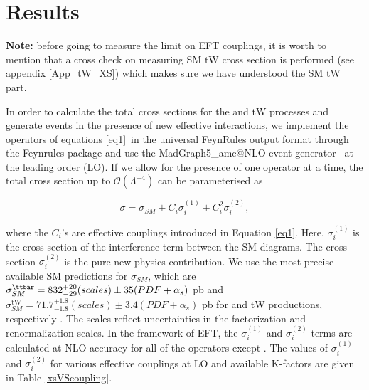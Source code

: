 \clearpage
\section{Results}
\label{tW_Results}

\textbf{Note:} before going to measure the limit on EFT couplings, it is worth to mention that a cross check on measuring SM tW cross section is performed (see appendix \ref{App_tW_XS}) which makes sure we have understood the SM tW part.

\medskip

In order to calculate the total cross sections for the \ttbar and tW processes and generate events in the presence of new effective interactions, we implement the operators of equations \ref{eq1}~in the universal FeynRules output format \cite{Degrande:2011ua} through the
Feynrules package \cite{Alloul:2013bka} and use the {\sc MadGraph5\_}a{\sc mc@NLO} event generator~\cite{MADGRAPH,Alwall:2014hca} at the leading order (LO).
If we allow for the presence of one operator at a time, the total cross section up to $\mathcal{O}(\Lambda^{-4})$ can be parameterised as

\begin{equation}
\label{eq:Limit}
        \sigma=\sigma_{SM}+C_i\sigma_i^{(1)}+C_i^2\sigma_{i}^{(2)},
\end{equation}

where the $C_i$'s are effective couplings introduced in Equation \ref{eq1}. Here, $\sigma_i^{(1)}$ is the cross section of the interference term between the SM diagrams. The cross section $\sigma_i^{(2)}$ is the pure new physics contribution.
We use the most precise available SM predictions for $\sigma_{SM}$, which are $\sigma_{SM}^{\ttbar} = 832^{+20}_{-29}(scales)\pm 35(PDF+\alpha_{s})$ pb and $\sigma_{SM}^{\mathrm{tW}} = 71.7^{+1.8}_{-1.8}(scales)\pm 3.4(PDF+\alpha_{s})$ pb for \ttbar and tW productions, respectively \cite{Czakon:2011xx,Kidonakis:2015nna}.
The scales reflect uncertainties  in  the  factorization and  renormalization scales.
In the framework of EFT, the $\sigma_i^{(1)}$  and $\sigma_i^{(2)}$ terms are calculated at NLO accuracy for all of the operators except \OG.
The values of $\sigma_i^{(1)}$ and $\sigma_i^{(2)}$ for various effective couplings at LO and available K-factors are given in Table \ref{xsVScoupling}.



